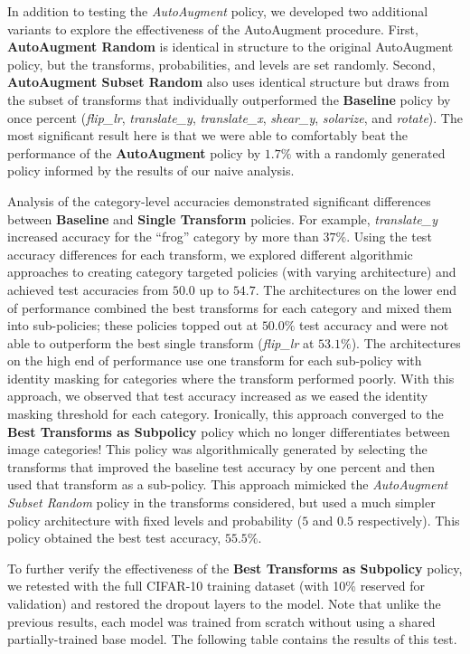 \documentclass[10pt,twocolumn,letterpaper]{article}
\begin{document}
    In addition to testing the \textit{AutoAugment} policy, we developed two additional variants to explore the effectiveness of the AutoAugment procedure. First, \textbf{AutoAugment Random} is identical in structure to the original AutoAugment policy, but the transforms, probabilities, and levels are set randomly. Second, \textbf{AutoAugment Subset Random} also uses identical structure but draws from the subset of transforms that individually outperformed the \textbf{Baseline} policy by once percent (\textit{flip\_lr}, \textit{translate\_y}, \textit{translate\_x}, \textit{shear\_y}, \textit{solarize}, and \textit{rotate}). The most significant result here is that we were able to comfortably beat the performance of the \textbf{AutoAugment} policy by $1.7\%$ with a randomly generated policy informed by the results of our naive analysis.

    Analysis of the category-level accuracies demonstrated significant differences between \textbf{Baseline} and \textbf{Single Transform} policies. For example, \textit{translate\_y} increased accuracy for the ``frog'' category by more than $37\%$. Using the test accuracy differences for each transform, we explored different algorithmic approaches to creating category targeted policies (with varying architecture) and achieved test accuracies from $50.0$ up to $54.7$. The architectures on the lower end of performance combined the best transforms for each category and mixed them into sub-policies; these policies topped out at $50.0\%$ test accuracy and were not able to outperform the best single transform (\textit{flip\_lr} at $53.1\%$). The architectures on the high end of performance use one transform for each sub-policy with identity masking for categories where the transform performed poorly. With this approach, we observed that test accuracy increased as we eased the identity masking threshold for each category. Ironically, this approach converged to the \textbf{Best Transforms as Subpolicy} policy which no longer differentiates between image categories! This policy was algorithmically generated by selecting the transforms that improved the baseline test accuracy by one percent and then used that transform as a sub-policy. This approach mimicked the \textit{AutoAugment Subset Random} policy in the transforms considered, but used a much simpler policy architecture with fixed levels and probability ($5$ and $0.5$ respectively). This policy obtained the best test accuracy, $55.5\%$.

    To further verify the effectiveness of the \textbf{Best Transforms as Subpolicy} policy, we retested with the full CIFAR-10 training dataset (with 10\% reserved for validation) and restored the dropout layers to the model. Note that unlike the previous results, each model was trained from scratch without using a shared partially-trained base model. The following table contains the results of this test.
\end{document}

